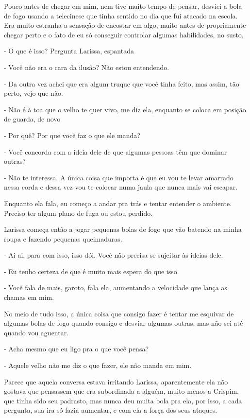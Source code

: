 Pouco antes de chegar em mim, nem tive muito tempo de pensar, desviei a bola de fogo usando a telecinese que tinha sentido no dia que fui atacado na escola. Era muito estranha a sensação de encostar em algo, muito antes de propriamente chegar perto e o fato de eu só conseguir controlar algumas habilidades, no susto.

- O que é isso? Pergunta Larissa, espantada 

- Você não era o cara da ilusão? Não estou entendendo.

- Da outra vez achei que era algum truque que você tinha feito, mas assim, tão perto, vejo que não.

- Não é à toa que o velho te quer vivo, me diz ela, enquanto se coloca em posição de guarda, de novo

- Por quê? Por que você faz o que ele manda?

- Você concorda com a ideia dele de que algumas pessoas têm que dominar outras?

- Não te interessa. A única coisa que importa é que eu vou te levar amarrado nessa corda e dessa vez vou te colocar numa jaula que nunca mais vai escapar.

Enquanto ela fala, eu começo a andar pra trás e tentar entender o ambiente. Preciso ter algum plano de fuga ou estou perdido.

Larissa começa então a jogar pequenas bolas de fogo que vão batendo na minha roupa e fazendo pequenas queimaduras.

- Ai ai, para com isso, isso dói. Você não precisa se sujeitar às ideias dele.

- Eu tenho certeza de que é muito mais espera do que isso.

- Você fala de mais, garoto, fala ela, aumentando a velocidade que lança as chamas em mim.

No meio de tudo isso, a única coisa que consigo fazer é tentar me esquivar de algumas bolas de fogo quando consigo e desviar algumas outras, mas não sei até quando vou aguentar.

- Acha mesmo que eu ligo pra o que você pensa?

- Aquele velho não me diz o que fazer, ele não manda em mim.

Parece que aquela conversa estava irritando Larissa, aparentemente ela não gostava que pensassem que era subordinada a alguém, muito menos a Crispim, que tinha sido seu padrasto, mas nunca deu muita bola pra ela, por isso, a cada pergunta, sua ira só fazia aumentar, e com ela a força dos seus ataques.

